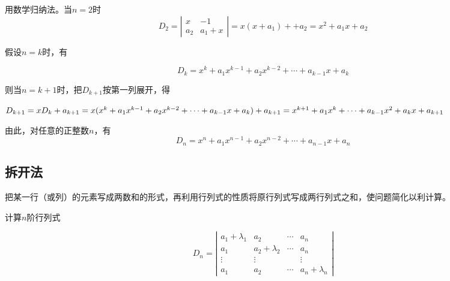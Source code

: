 \begin{solution}
    用数学归纳法。当$n=2$时
$$D_{2}=\left|\begin{array}{ccccccc}
        x     & -1      \\
        a_{2} & a_{1}+x
    \end{array}\right|=x(x+a_{1})++a_{2}=x^{2}+a_{1}x+a_{2}
$$

假设$n=k$时，有

$$D_{k}=x^{k}+a_{1}x^{k-1}+a_{2}x^{k-2}+\cdots+a_{k-1}x+a_{k}
$$

则当$n=k+1$时，把$D_{k+1}$按第一列展开，得

$D_{k+1}=xD_{k}+a_{k+1}=x(x^{k}+a_{1}x^{k-1}+a_{2}x^{k-2}+\cdots+a_{k-1}x+a_{k})+a_{k+1}\\
    =x^{k+1}+a_{1}x^{k}+\cdots+a_{k-1}x^{2}+a_{k}x+a_{k+1}
$

由此，对任意的正整数$n$，有
$$D_{n}=x^{n}+a_{1}x^{n-1}+a_{2}x^{n-2}+\cdots+a_{n-1}x+a_{n}$$
\end{solution}

\subsection{拆开法}

把某一行（或列）的元素写成两数和的形式，再利用行列式的性质将原行列式写成两行列式之和，使问题简化以利计算。

\begin{example}
    计算$n$阶行列式

$$D_{n}=\left|\begin{array}{ccccccc}
        a_{1}+\lambda _{1} & a_{2}              & \cdots & a_{n}              \\
        a_{1}              & a_{2}+\lambda _{2} & \cdots & a_{n}              \\
        \vdots             & \vdots             &        & \vdots             \\
        a_{1}              & a_{2}              & \cdots & a_{n}+\lambda _{n}
    \end{array}\right|$$
\end{example}

